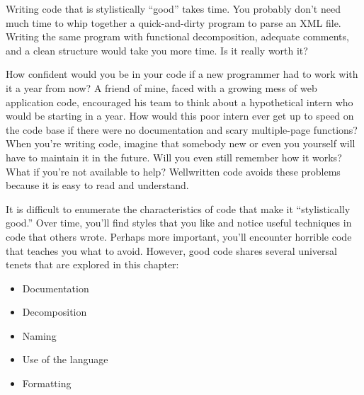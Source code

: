 
Writing code that is stylistically “good” takes time. You probably don’t need much time to whip together a quick-and-dirty program to parse an XML file. Writing the same program with functional decomposition, adequate comments, and a clean structure would take you more time. Is it really worth it?


How confident would you be in your code if a new programmer had to work with it a year from now? A friend of mine, faced with a growing mess of web application code, encouraged his team to think about a hypothetical intern who would be starting in a year. How would this poor intern ever get up to speed on the code base if there were no documentation and scary multiple-page functions? When you’re writing code, imagine that somebody new or even you yourself will have to maintain it in the future. Will you even still remember how it works? What if you’re not available to help? Wellwritten code avoids these problems because it is easy to read and understand.


It is difficult to enumerate the characteristics of code that make it “stylistically good.” Over time, you’ll find styles that you like and notice useful techniques in code that others wrote. Perhaps more important, you’ll encounter horrible code that teaches you what to avoid. However, good code shares several universal tenets that are explored in this chapter:

\begin{itemize}
\item
Documentation

\item
Decomposition

\item
Naming

\item
Use of the language

\item
Formatting
\end{itemize}





